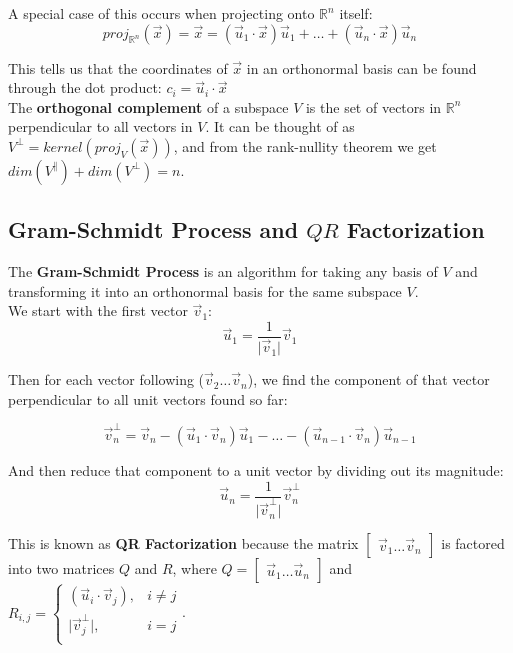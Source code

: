 \documentclass[]{scrartcl}
\begin{document}
	A special case of this occurs when projecting onto $\mathbb{R}^n$ itself:
	$$
	proj_{\mathbb{R}^n}(\vec{x}) = \vec{x} = (\vec{u}_1 \cdot \vec{x})\vec{u}_1 + \ldots + (\vec{u}_n \cdot \vec{x})\vec{u}_n
	$$
	
	This tells us that the coordinates of $\vec{x}$ in an orthonormal basis can be found through the dot product: $c_i = \vec{u}_i \cdot \vec{x}$\\
	
	The \textbf{orthogonal complement} of a subspace $V$ is the set of vectors in $\mathbb{R}^n$ perpendicular to all vectors in $V$. It can be thought of as $V^\perp = kernel(proj_V(\vec{x}))$, and from the rank-nullity theorem we get $dim(V^\parallel) + dim(V^\perp) = n$.
	
	\subsection{Gram-Schmidt Process and $QR$ Factorization}
	The \textbf{Gram-Schmidt Process} is an algorithm for taking any basis of $V$ and transforming it into an orthonormal basis for the same subspace $V$.\\
	
	We start with the first vector $\vec{v}_1$:
	$$
	\vec{u}_1 = \frac{1}{\lvert \vec{v}_1 \rvert} \vec{v}_1
	$$
	
	Then for each vector following ($\vec{v}_2 \ldots \vec{v}_n$), we find the component of that vector perpendicular to all unit vectors found so far:
	
	$$
	\vec{v}_{n}^{\perp} = \vec{v}_n - (\vec{u}_1 \cdot \vec{v}_n)\vec{u}_1 - \ldots - (\vec{u}_{n-1} \cdot \vec{v}_n)\vec{u}_{n-1}
	$$
	
	And then reduce that component to a unit vector by dividing out its magnitude:
	$$
	\vec{u}_n = \frac{1}{\lvert \vec{v}_{n}^{\perp} \rvert} \vec{v}_{n}^{\perp}
	$$
	
	This is known as \textbf{QR Factorization} because the matrix $\begin{bmatrix}
	\vec{v}_1 \ldots \vec{v}_n
	\end{bmatrix}$ is factored into two matrices $Q$ and $R$, where $Q = \begin{bmatrix}
	\vec{u}_1 \ldots \vec{u}_n
	\end{bmatrix}$
	and $R_{i, j} = \begin{cases}
	(\vec{u}_i \cdot \vec{v}_j), & i \neq j\\
	\lvert \vec{v}_{j}^{\perp} \rvert, & i = j\\
	\end{cases}$.\\
	
\end{document}
